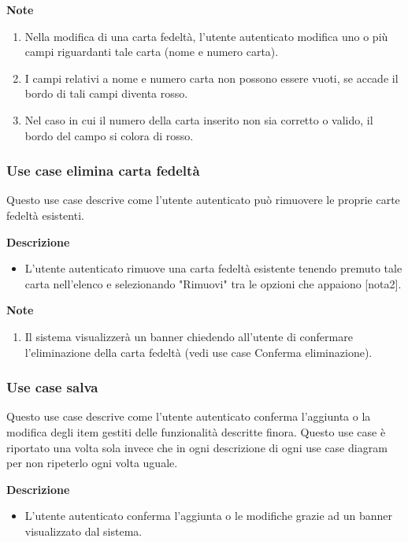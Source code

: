 \documentclass[a4paper,12pt]{article}
\begin{document}
\textbf{Note}
\begin{enumerate} \setlength\itemsep{0.01em}
\item Nella modifica di una carta fedeltà, l'utente autenticato modifica uno o più campi riguardanti tale carta  (nome e numero carta).
\item I campi relativi a nome e numero carta non possono essere vuoti, se accade il bordo di tali campi diventa rosso.
\item Nel caso in cui il numero della carta inserito non sia corretto o valido, il bordo del campo si colora di rosso.
\end{enumerate}



\subsubsection*{Use case elimina carta fedeltà}

 Questo use case descrive come l'utente autenticato può rimuovere le proprie carte fedeltà esistenti.
 
\textbf{Descrizione}
\begin{itemize} \setlength\itemsep{0.01em}
\item L'utente autenticato rimuove una carta fedeltà esistente tenendo premuto tale carta nell'elenco e selezionando "Rimuovi" tra le opzioni che appaiono [nota2].
\end{itemize}

\textbf{Note}
\begin{enumerate} \setlength\itemsep{0.01em}
\item Il sistema visualizzerà un banner chiedendo all'utente di confermare l'eliminazione della carta fedeltà  (vedi use case Conferma eliminazione).
\end{enumerate}





\subsubsection*{Use case salva}

 Questo use case descrive come l'utente autenticato conferma l'aggiunta o la modifica degli item gestiti delle funzionalità descritte finora.
 Questo use case è riportato una volta sola invece che in ogni descrizione di ogni use case diagram per non ripeterlo ogni volta uguale. 
 
\textbf{Descrizione}
\begin{itemize} \setlength\itemsep{0.01em}
\item L'utente autenticato conferma l'aggiunta o le modifiche grazie ad un banner visualizzato dal sistema.
\end{itemize}
\end{document}
